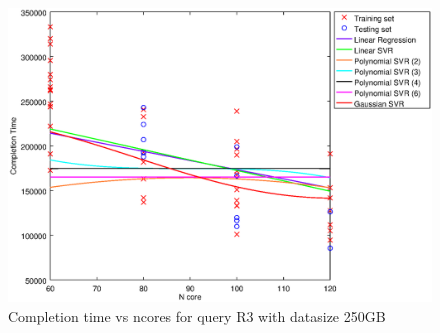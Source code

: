 
\begin {figure}[hbtp]
\centering
\includegraphics[width=\textwidth]{output/R3_250_LINEAR_NCORE/plot_R3_250.eps}
\caption{Completion time vs ncores for query R3 with datasize 250GB}
\label{fig:coreonly_linear_R3_250}
\end {figure}
